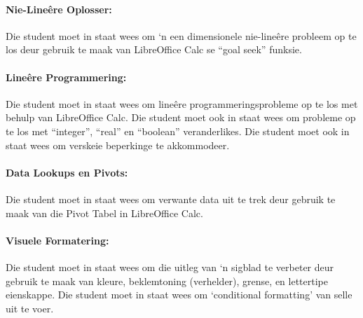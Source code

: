             \paragraph{Nie-Line\^{e}re Oplosser:}
                Die student moet in staat wees om `n een dimensionele
                nie-line\^{e}re probleem op te los deur gebruik te maak van
                LibreOffice Calc se ``goal seek'' funksie.

            \paragraph{Line\^{e}re Programmering:}
                Die student moet in staat wees om line\^{e}re
                programmeringsprobleme op te los met behulp van LibreOffice
                Calc. Die student moet ook in staat wees om probleme op te los
                met ``integer'', ``real'' en ``boolean'' veranderlikes.  Die
                student moet ook in staat wees om verskeie beperkinge te
                akkommodeer.

            \paragraph{Data Lookups en Pivots:}
                Die student moet in staat wees om verwante data uit te trek
                deur gebruik te maak van die Pivot Tabel in LibreOffice
                Calc.

            \paragraph{Visuele Formatering:}
                Die student moet in staat wees om die uitleg van `n sigblad te
                verbeter deur gebruik te maak van kleure, beklemtoning
                (verhelder), grense, en lettertipe eienskappe.  Die student moet
                in staat wees om `conditional formatting' van selle uit te
                voer.
